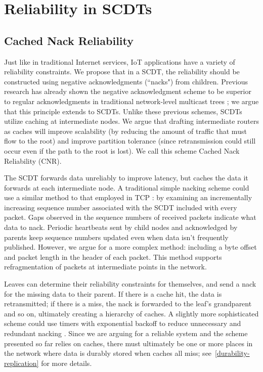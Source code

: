 \chapter{Reliability in SCDTs}
\label{reliability}

\section{Cached Nack Reliability}
Just like in traditional Internet services, IoT applications have a variety of
reliability constraints.  We propose that in a SCDT, the reliability should be
constructed using negative acknowledgments (``nacks") from children.  Previous
research has already shown the negative acknowledgment scheme to be superior to
regular acknowledgments in traditional network-level multicast trees
\cite{SRM, RFC3208}; we argue that this principle extends to SCDTs.
Unlike these previous schemes, SCDTs utilize caching at intermediate nodes.  We
argue that drafting intermediate routers as caches will improve scalability (by
reducing the amount of traffic that must flow to the root) and improve partition
tolerance (since retransmission could still occur even if the path to the root
is lost).  We call this scheme Cached Nack Reliability (CNR).

The SCDT forwards data unreliably to improve latency, but caches the data it
forwards at each intermediate node.  A traditional simple nacking scheme could use a similar method to that employed in TCP \cite{RFC0793}: by examining an incrementally increasing sequence number associated with the SCDT included with every packet.  Gaps observed in the sequence numbers of received packets indicate what data to nack.  Periodic heartbeats sent by child nodes and acknowledged by parents keep sequence numbers updated even when data isn't frequently published.  However, we argue for a more complex method: including a byte offset and packet length in the header of each packet.  This method supports refragmentation of packets at intermediate points in the network.

Leaves can determine their reliability constraints for themselves, and send a
nack for the missing data to their parent.  If there is a cache hit, the data is
retransmitted; if there is a miss, the nack is forwarded to the leaf's
grandparent and so on, ultimately creating a hierarchy of caches.  A slightly
more sophisticated scheme could use timers with exponential backoff to reduce
unnecessary and redundant nacking \cite{SRM, RFC3208}.  Since we are
arguing for a reliable system and the scheme presented so far relies on caches,
there must ultimately be one or more places in the network where data is durably
stored when caches all miss; 
see~\autoref{durability-replication} for more
details.

